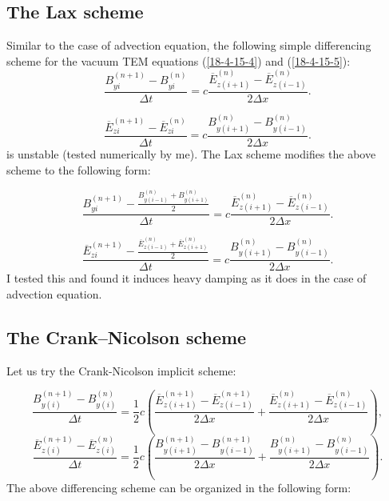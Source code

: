\documentclass{article}
\begin{document}
\subsection{The Lax scheme}

Similar to the case of advection equation, the following simple differencing
scheme for the vacuum TEM equations (\ref{18-4-15-4}) and (\ref{18-4-15-5}):
\begin{equation}
  \frac{B_{y i}^{(n + 1)} - B_{y i}^{(n)}}{\Delta t} = c \frac{\overline{E}_{z
  (i + 1)}^{(n)} - \overline{E}_{z (i - 1)}^{(n)}}{2 \Delta x} .
\end{equation}

\begin{equation}
  \frac{\overline{E}_{z i}^{(n + 1)} - \overline{E}_{z i}^{(n)}}{\Delta t} = c
  \frac{B_{y (i + 1)}^{(n)} - B_{y (i - 1)}^{(n)}}{2 \Delta x} .
\end{equation}
is unstable (tested numerically by me). The Lax scheme modifies the above
scheme to the following form:


\begin{equation}
  \frac{B_{y i}^{(n + 1)} - \frac{B_{y (i - 1)}^{(n)} + B_{y (i +
  1)}^{(n)}}{2}}{\Delta t} = c \frac{\overline{E}_{z (i + 1)}^{(n)} -
  \overline{E}_{z (i - 1)}^{(n)}}{2 \Delta x} .
\end{equation}

\begin{equation}
  \frac{\overline{E}_{z i}^{(n + 1)} - \frac{\overline{E}_{z (i - 1)}^{(n)} +
  \overline{E}_{z (i + 1)}^{(n)}}{2}}{\Delta t} = c \frac{B_{y (i + 1)}^{(n)}
  - B_{y (i - 1)}^{(n)}}{2 \Delta x} .
\end{equation}
I tested this and found it induces heavy damping as it does in the case of
advection equation.

\subsection{The Crank--Nicolson scheme}

Let us try the Crank-Nicolson implicit scheme:


\begin{equation}
  \frac{B_{y (i)}^{(n + 1)} - B_{y (i)}^{(n)}}{\Delta t} = \frac{1}{2} c
  \left( \frac{\overline{E}_{z (i + 1)}^{(n + 1)} - \overline{E}_{z (i -
  1)}^{(n + 1)}}{2 \Delta x} + \frac{\overline{E}_{z (i + 1)}^{(n)} -
  \overline{E}_{z (i - 1)}^{(n)}}{2 \Delta x} \right),
\end{equation}
\begin{equation}
  \frac{\overline{E}_{z (i)}^{(n + 1)} - \overline{E}_{z (i)}^{(n)}}{\Delta t}
  = \frac{1}{2} c \left( \frac{B_{y (i + 1)}^{(n + 1)} - B_{y (i - 1)}^{(n +
  1)}}{2 \Delta x} + \frac{B_{y (i + 1)}^{(n)} - B_{y (i - 1)}^{(n)}}{2 \Delta
  x} \right) .
\end{equation}
The above differencing scheme can be organized in the following form:
\end{document}
